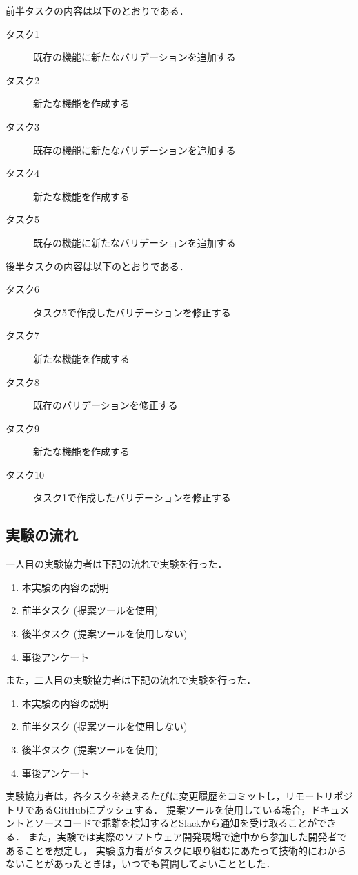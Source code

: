 前半タスクの内容は以下のとおりである．
\begin{description}
    \item[タスク1] 既存の機能に新たなバリデーションを追加する
    \item[タスク2] 新たな機能を作成する
    \item[タスク3] 既存の機能に新たなバリデーションを追加する
    \item[タスク4] 新たな機能を作成する
    \item[タスク5] 既存の機能に新たなバリデーションを追加する
\end{description}

後半タスクの内容は以下のとおりである．
\begin{description}
    \item[タスク6] タスク5で作成したバリデーションを修正する
    \item[タスク7] 新たな機能を作成する
    \item[タスク8] 既存のバリデーションを修正する
    \item[タスク9] 新たな機能を作成する
    \item[タスク10] タスク1で作成したバリデーションを修正する
\end{description}

\subsection{実験の流れ}
一人目の実験協力者は下記の流れで実験を行った．
\begin{enumerate}
    \item 本実験の内容の説明
    \item 前半タスク (提案ツールを使用)
    \item 後半タスク (提案ツールを使用しない)
    \item 事後アンケート
\end{enumerate}

また，二人目の実験協力者は下記の流れで実験を行った．
\begin{enumerate}
    \item 本実験の内容の説明
    \item 前半タスク (提案ツールを使用しない)
    \item 後半タスク (提案ツールを使用)
    \item 事後アンケート
\end{enumerate}

実験協力者は，各タスクを終えるたびに変更履歴をコミットし，リモートリポジトリであるGitHubにプッシュする．
提案ツールを使用している場合，ドキュメントとソースコードで乖離を検知するとSlackから通知を受け取ることができる．
また，実験では実際のソフトウェア開発現場で途中から参加した開発者であることを想定し，
実験協力者がタスクに取り組むにあたって技術的にわからないことがあったときは，いつでも質問してよいこととした．